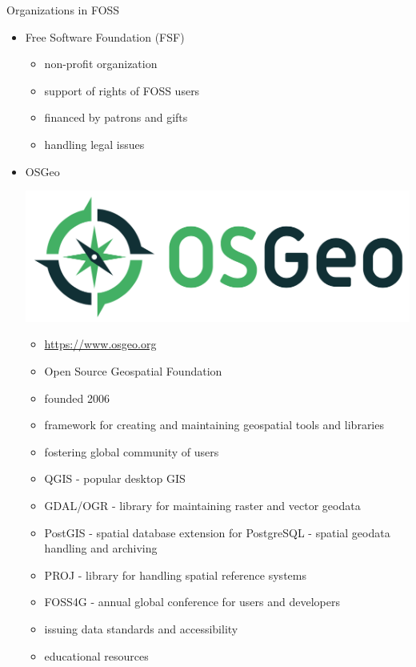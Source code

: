 \documentclass{beamer}
\begin{document}
        \begin{frame}[allowframebreaks]{Organizations in FOSS}
            \begin{itemize}
                \item Free Software Foundation (FSF)
                    \begin{itemize}
                        \item non-profit organization 
                        \item support of rights of FOSS users
                        \item financed by patrons and gifts
                        \item handling legal issues
                    \end{itemize}

                \item OSGeo
                
                    \includegraphics[scale=0.07, right]{figs/osgeo-logo.png}
                   

                    \begin{itemize}
                        \item \url{https://www.osgeo.org}
                        \item Open Source Geospatial Foundation
                        \item founded 2006
                        \item framework for creating and maintaining geospatial tools and libraries
                        \item fostering global community of users
                        \item QGIS - popular desktop GIS
                        \item GDAL/OGR - library for maintaining raster and vector geodata
                        \item PostGIS - spatial database extension for PostgreSQL - spatial geodata handling and archiving
                        \item PROJ - library for handling spatial reference systems
                        \item FOSS4G - annual global conference for users and developers
                        \item issuing data standards and accessibility
                        \item educational resources
                    \end{itemize}


\end{itemize}
\end{frame}
\end{document}
